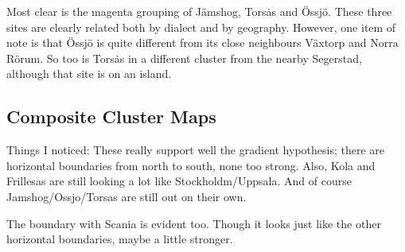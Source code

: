 Most clear is the magenta grouping of J\"amshog, Tors\.as and
\"Ossj\"o. These three sites are clearly related both by dialect and
by geography. However, one item of note is that \"Ossj\"o is quite
different from its close neighbours V\"axtorp and Norra R\"orum. So
too is Tors\.as in a different cluster from the nearby Segerstad,
although that site is on an island.




\subsection{Composite Cluster Maps}

Things I noticed: These really support well the gradient hypothesis;
there are horizontal boundaries from north to south, none too
strong. Also, Kola and Frillesas are still looking a lot like
Stockholdm/Uppsala. And of course Jamshog/Ossjo/Torsas are still out
on their own.

The boundary with Scania is evident too. Though it looks just like the
other horizontal boundaries, maybe a little stronger.

